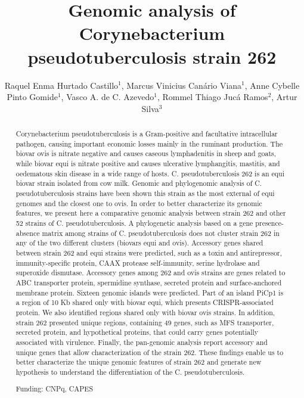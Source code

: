 \documentclass[twoside]{article}
\title{\vspace{-15mm}\fontsize{24pt}{10pt}\selectfont\textbf{Genomic analysis of Corynebacterium pseudotuberculosis strain 262}} %
\author{Raquel Enma Hurtado Castillo$^1$, Marcus Vinicius Can\'ario Viana$^1$, Anne Cybelle Pinto Gomide$^1$, Vasco A. de C. Azevedo$^1$, Rommel Thiago Juc\'a Ramos$^2$, Artur Silva$^3$}
\affil{1 UFMG\\ 2 UNIVSERSIDADE FEDERAL DO PARA\\ 3 UFPA\\ }
\date{}
\begin{document}
\maketitle %

\thispagestyle{fancy} %


\begin{abstract}
Corynebacterium pseudotuberculosis is a Gram-positive and facultative intracellular pathogen, causing important economic losses mainly in the ruminant production. The biovar ovis is nitrate negative and causes caseous lymphadenitis in sheep and goats, while biovar equi is nitrate positive and causes ulcerative lymphangitis, mastitis, and oedematous skin disease in a wide range of hosts. C. pseudotuberculosis 262 is an equi biovar strain isolated from cow milk. Genomic and phylogenomic analysis of C. pseudotuberculosis strains have been shown this strain as the most external of equi genomes and the closest one to ovis. In order to better characterize its genomic features, we present here a comparative genomic analysis between strain 262 and other 52 strains of C. pseudotuberculosis. A phylogenetic analysis based on a gene presence-absence matrix among strains of C. pseudotuberculosis does not cluster strain 262 in any of the two different clusters (biovars equi and ovis). Accessory genes shared between strain 262 and equi strains were predicted, such as a toxin and antirepressor, immunity-specific protein, CAAX protease self-immunity, serine hydrolase and superoxide dismutase. Accessory genes among 262 and ovis strains are genes related to ABC transporter protein, spermidine synthase, secreted protein and surface-anchored membrane protein. Sixteen genomic islands were predicted. Part of an island PiCp1 is a region of 10 Kb shared only with biovar equi, which presents CRISPR-associated protein. We also identified regions shared only with biovar ovis strains. In addition, strain 262 presented unique regions, containing 49 genes, such as MFS transporter, secreted protein, and hypothetical proteins, that could carry genes potentially associated with virulence. Finally, the pan-genomic analysis report accessory and unique genes that allow characterization of the strain 262. These findings enable us to better characterize the unique genomic features of strain 262 and generate new hypothesis to understand the differentiation of the C. pseudotuberculosis.

Funding: CNPq, CAPES
\end{abstract}
\end{document}
